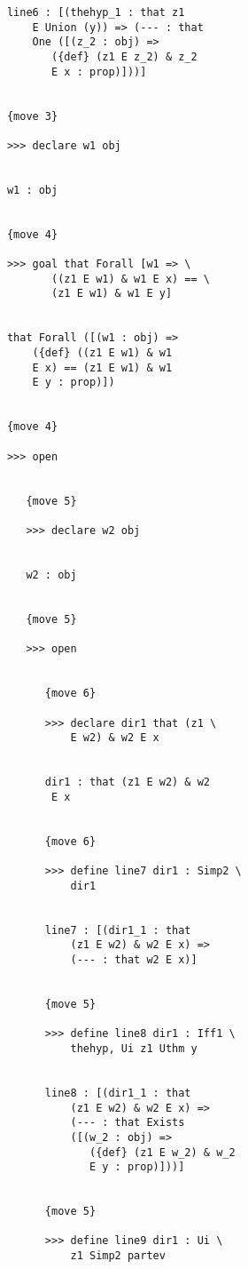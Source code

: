 \documentclass[12pt]{article}
\begin{document}
\begin{verbatim}
            line6 : [(thehyp_1 : that z1 
                E Union (y)) => (--- : that 
                One ([(z_2 : obj) => 
                   ({def} (z1 E z_2) & z_2 
                   E x : prop)]))]


            {move 3}

            >>> declare w1 obj


            w1 : obj


            {move 4}

            >>> goal that Forall [w1 => \
                   ((z1 E w1) & w1 E x) == \
                   (z1 E w1) & w1 E y]


            that Forall ([(w1 : obj) => 
                ({def} ((z1 E w1) & w1 
                E x) == (z1 E w1) & w1 
                E y : prop)])


            {move 4}

            >>> open


               {move 5}

               >>> declare w2 obj


               w2 : obj


               {move 5}

               >>> open


                  {move 6}

                  >>> declare dir1 that (z1 \
                      E w2) & w2 E x


                  dir1 : that (z1 E w2) & w2 
                   E x


                  {move 6}

                  >>> define line7 dir1 : Simp2 \
                      dir1


                  line7 : [(dir1_1 : that 
                      (z1 E w2) & w2 E x) => 
                      (--- : that w2 E x)]


                  {move 5}

                  >>> define line8 dir1 : Iff1 \
                      thehyp, Ui z1 Uthm y


                  line8 : [(dir1_1 : that 
                      (z1 E w2) & w2 E x) => 
                      (--- : that Exists 
                      ([(w_2 : obj) => 
                         ({def} (z1 E w_2) & w_2 
                         E y : prop)]))]


                  {move 5}

                  >>> define line9 dir1 : Ui \
                      z1 Simp2 partev



\end{verbatim}
\end{document}
